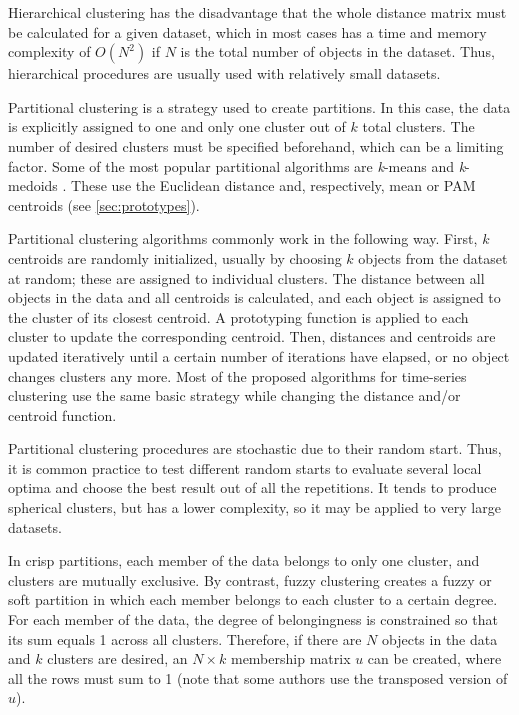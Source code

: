 Hierarchical clustering has the disadvantage that the whole distance matrix must be calculated for a given dataset,
which in most cases has a time and memory complexity of $O(N^2)$ if $N$ is the total number of objects in the dataset.
Thus, hierarchical procedures are usually used with relatively small datasets.

Partitional clustering is a strategy used to create partitions.
In this case, the data is explicitly assigned to one and only one cluster out of $k$ total clusters.
The number of desired clusters must be specified beforehand,
which can be a limiting factor.
Some of the most popular partitional algorithms are \textit{k}-means and \textit{k}-medoids \citep{hastie2009}.
These use the Euclidean distance and, respectively, mean or PAM centroids (see \cref{sec:prototypes}).

Partitional clustering algorithms commonly work in the following way.
First, $k$ centroids are randomly initialized,
usually by choosing $k$ objects from the dataset at random;
these are assigned to individual clusters.
The distance between all objects in the data and all centroids is calculated,
and each object is assigned to the cluster of its closest centroid.
A prototyping function is applied to each cluster to update the corresponding centroid.
Then, distances and centroids are updated iteratively until a certain number of iterations have elapsed,
or no object changes clusters any more.
Most of the proposed algorithms for time-series clustering use the same basic strategy while changing the distance and/or centroid function.

Partitional clustering procedures are stochastic due to their random start.
Thus, it is common practice to test different random starts to evaluate several local optima and choose the best result out of all the repetitions.
It tends to produce spherical clusters,
but has a lower complexity,
so it may be applied to very large datasets.

In crisp partitions,
each member of the data belongs to only one cluster,
and clusters are mutually exclusive.
By contrast,
fuzzy clustering creates a fuzzy or soft partition in which each member belongs to each cluster to a certain degree.
For each member of the data, the degree of belongingness is constrained so that its sum equals 1 across all clusters.
Therefore, if there are $N$ objects in the data and $k$ clusters are desired,
an $N \times k$ membership matrix $u$ can be created,
where all the rows must sum to 1
(note that some authors use the transposed version of $u$).

